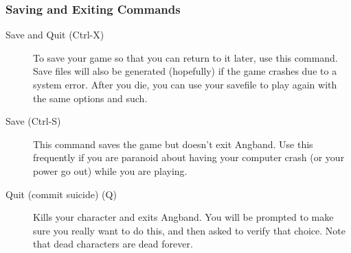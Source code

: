 \subsubsection{Saving and Exiting Commands} 
\begin{description}
\item[Save and Quit (Ctrl-X)]
  To save your game so that you can return to it later, use this
  command. Save files will also be generated (hopefully) if the game
  crashes due to a system error. After you die, you can use your savefile
  to play again with the same options and such.

\item[Save (Ctrl-S)]
  This command saves the game but doesn't exit Angband. Use this
  frequently if you are paranoid about having your computer crash (or your
  power go out) while you are playing.

\item[Quit (commit suicide) (Q)]
  Kills your character and exits Angband. You will be prompted to make
  sure you really want to do this, and then asked to verify that
  choice. Note that dead characters are dead forever.
\end{description}

